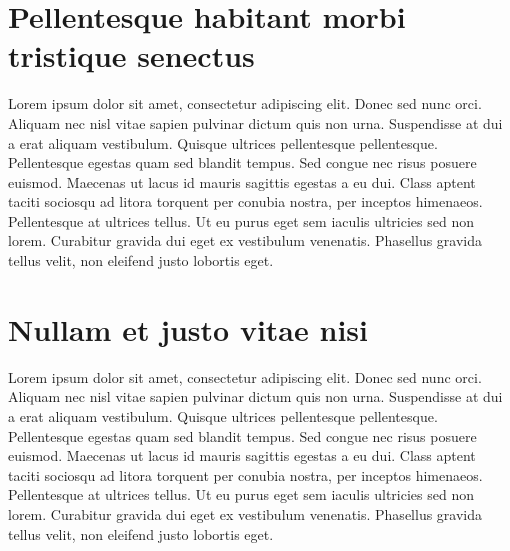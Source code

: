 \section{Pellentesque habitant morbi tristique senectus}
\label{sec:context}

Lorem ipsum dolor sit amet, consectetur adipiscing elit. Donec sed nunc orci.
Aliquam nec nisl vitae sapien pulvinar dictum quis non urna. Suspendisse at dui a
erat aliquam vestibulum. Quisque ultrices pellentesque pellentesque. Pellentesque
egestas quam sed blandit tempus. Sed congue nec risus posuere euismod. Maecenas ut
lacus id mauris sagittis egestas a eu dui. Class aptent taciti sociosqu ad
litora torquent per conubia nostra, per inceptos himenaeos. Pellentesque at
ultrices tellus. Ut eu purus eget sem iaculis ultricies sed non lorem. Curabitur
gravida dui eget ex vestibulum venenatis. Phasellus gravida tellus velit, non
eleifend justo lobortis eget. \cite{ictbusiness} \cite{donoho}

\section{Nullam et justo vitae nisi}
\label{sec:problem}

Lorem ipsum dolor sit amet, consectetur adipiscing elit. Donec sed nunc orci.
Aliquam nec nisl vitae sapien pulvinar dictum quis non urna. Suspendisse at dui a
erat aliquam vestibulum. Quisque ultrices pellentesque pellentesque. Pellentesque
egestas quam sed blandit tempus. Sed congue nec risus posuere euismod. Maecenas ut
lacus id mauris sagittis egestas a eu dui. Class aptent taciti sociosqu ad
litora torquent per conubia nostra, per inceptos himenaeos. Pellentesque at
ultrices tellus. Ut eu purus eget sem iaculis ultricies sed non lorem. Curabitur
gravida dui eget ex vestibulum venenatis. Phasellus gravida tellus velit, non
eleifend justo lobortis eget.